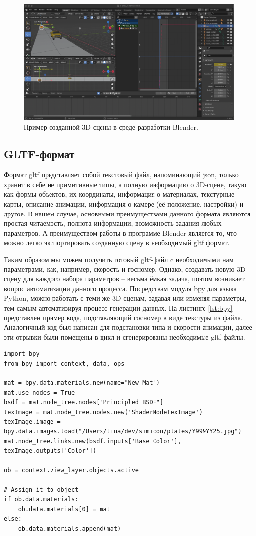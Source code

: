 \documentclass[specification,annotation,times]{itmo-student-thesis}
\begin{document}
\begin{figure}[!ht]
	\caption{Пример созданной 3D-сцены в среде разработки Blender.}\label{img:blender}
	\includegraphics[width=0.85\linewidth]{../png/blender.png}
	\centering
\end{figure}

\subsection{GLTF-формат}
Формат gltf представляет собой текстовый файл, напоминающий json, только хранит в себе не примитивные типы, а полную информацию о 3D-сцене, такую как формы объектов, их координаты, информация о материалах, текстурные карты, описание анимации, информация о камере (её положение, настройки) и другое. В нашем случае, основными преимуществами данного формата являются простая читаемость, полнота информации, возможность задания любых параметров. А преимуществом работы в программе Blender является то, что можно легко экспортировать созданную сцену в необходимый gltf формат.

Таким образом мы можем получить готовый gltf-файл c необходимыми нам параметрами, как, например, скорость и госномер. Однако, создавать новую 3D-сцену для каждого набора параметров – весьма ёмкая задача, поэтом возникает вопрос автоматизации данного процесса. Посредствам модуля bpy для языка Python, можно работать с теми же 3D-сценам, задавая или изменяя параметры, тем самым автоматизируя процесс генерации данных. На листинге \ref{lst:bpy} представлен пример кода, подставляющий госномер в виде текстуры из файла. Аналогичный код был написан для подстановки типа и скорости анимации, далее эти отрывки были помещены в цикл и сгенерированы необходимые gltf-файлы.


\begin{lstlisting}[float=!h,caption={Пример скрипта для подстановки ГРЗ из файла на объект в 3D-сцене.},label={lst:bpy}]
import bpy
from bpy import context, data, ops

mat = bpy.data.materials.new(name="New_Mat")
mat.use_nodes = True
bsdf = mat.node_tree.nodes["Principled BSDF"]
texImage = mat.node_tree.nodes.new('ShaderNodeTexImage')
texImage.image = bpy.data.images.load("/Users/tina/dev/simicon/plates/Y999YY25.jpg")
mat.node_tree.links.new(bsdf.inputs['Base Color'], texImage.outputs['Color'])

ob = context.view_layer.objects.active

# Assign it to object
if ob.data.materials:
	ob.data.materials[0] = mat
else:
	ob.data.materials.append(mat)
\end{lstlisting}
\end{document}
